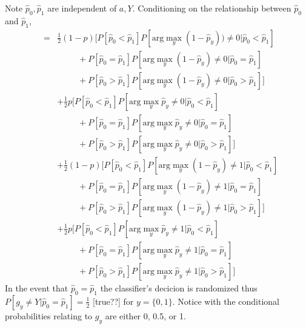 \documentclass{article}
\begin{document}
Note $\hat{p}_0, \hat{p}_1$ are independent of $a, Y$. Conditioning on the relationship between $\hat{p}_0$ and $\hat{p}_1$, 
\begin{eqnarray}
 &=& \frac{1}{2}(1-p)[ P[\hat{p}_0<\hat{p}_1] P[\textrm{arg} \max_y (1-\hat{p}_y) ) \neq 0|\hat{p}_0<\hat{p}_1] 
\\&&\ \ \ \ \ \ \ \ \ \ \ +P[\hat{p}_0=\hat{p}_1] P[\textrm{arg} \max_y (1-\hat{p}_y ) \neq 0|\hat{p}_0=\hat{p}_1]
\\&&\ \ \ \ \ \ \ \ \ \ \ +P[\hat{p}_0>\hat{p}_1] P[\textrm{arg} \max_y (1-\hat{p}_y ) \neq 0|\hat{p}_0>\hat{p}_1] ]
\\&& +\frac{1}{2}p [ P[\hat{p}_0<\hat{p}_1] P[\textrm{arg} \max_y \hat{p}_y \neq 0|\hat{p}_0<\hat{p}_1] 
\\&&\ \ \ \ \ \ \ \ \ \ \ +P[\hat{p}_0=\hat{p}_1] P[\textrm{arg} \max_y \hat{p}_y \neq 0|\hat{p}_0=\hat{p}_1]
\\&&\ \ \ \ \ \ \ \ \ \ \ +P[\hat{p}_0>\hat{p}_1] P[\textrm{arg} \max_y \hat{p}_y \neq 0|\hat{p}_0>\hat{p}_1] ]
\\&& + \frac{1}{2}(1-p)[ P[\hat{p}_0<\hat{p}_1] P[\textrm{arg} \max_y (1- \hat{p}_y ) \neq 1|\hat{p}_0<\hat{p}_1] 
\\&&\ \ \ \ \ \ \ \ \ \ \ +P[\hat{p}_0=\hat{p}_1] P[\textrm{arg} \max_y (1-\hat{p}_y ) \neq 1|\hat{p}_0=\hat{p}_1]
\\&&\ \ \ \ \ \ \ \ \ \ \ +P[\hat{p}_0>\hat{p}_1] P[\textrm{arg} \max_y (1- \hat{p}_y ) \neq 1|\hat{p}_0>\hat{p}_1] ]
\\&& +\frac{1}{2}p [ P[\hat{p}_0<\hat{p}_1] P[\textrm{arg} \max_y \hat{p}_y \neq 1|\hat{p}_0<\hat{p}_1] 
\\&&\ \ \ \ \ \ \ \ \ \ \ +P[\hat{p}_0=\hat{p}_1] P[\textrm{arg} \max_y \hat{p}_y \neq 1|\hat{p}_0=\hat{p}_1]
\\&&\ \ \ \ \ \ \ \ \ \ \ +P[\hat{p}_0>\hat{p}_1] P[\textrm{arg} \max_y \hat{p}_y \neq 1|\hat{p}_0>\hat{p}_1] ]
\end{eqnarray}
In the event that $\hat{p}_0=\hat{p}_1$ the classifier's decicion is randomized thus $P[g_y \neq Y|\hat{p}_0=\hat{p}_1] = \frac{1}{2}$ [true??] for $y=\{0,1\}$. Notice with the conditional probabilities relating to $g_y$ are either 0, 0.5, or 1.
\end{document}
